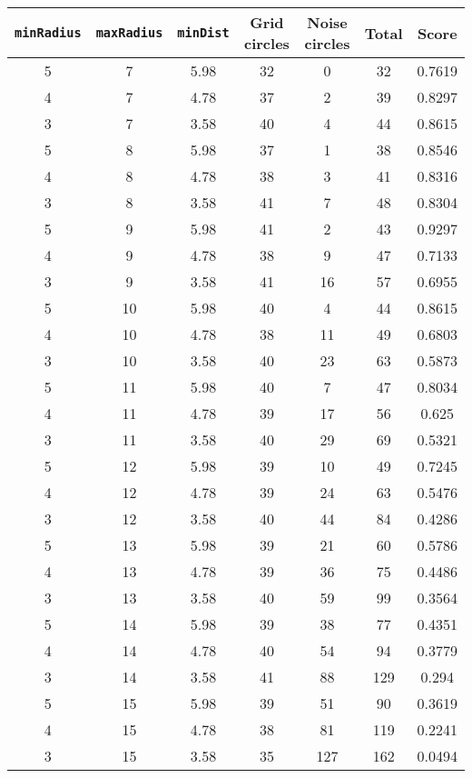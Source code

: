 \documentclass[letterpaper, 12pt]{article}
\begin{document}
\begin{longtable}{|c|c|c|c|c|c|c|}
\hline
\textbf{\texttt{minRadius}} & \textbf{\texttt{maxRadius}} & \textbf{\texttt{minDist}} & \textbf{Grid circles} & \textbf{Noise circles} & \textbf{Total} & \textbf{Score} \\
\hline
5 & 7 & 5.98 & 32 & 0 & 32 & 0.7619 \\
\hline
4 & 7 & 4.78 & 37 & 2 & 39 & 0.8297 \\
\hline
3 & 7 & 3.58 & 40 & 4 & 44 & 0.8615 \\
\hline
5 & 8 & 5.98 & 37 & 1 & 38 & 0.8546 \\
\hline
4 & 8 & 4.78 & 38 & 3 & 41 & 0.8316 \\
\hline
3 & 8 & 3.58 & 41 & 7 & 48 & 0.8304 \\
\hline
5 & 9 & 5.98 & 41 & 2 & 43 & 0.9297 \\
\hline
4 & 9 & 4.78 & 38 & 9 & 47 & 0.7133 \\
\hline
3 & 9 & 3.58 & 41 & 16 & 57 & 0.6955 \\
\hline
5 & 10 & 5.98 & 40 & 4 & 44 & 0.8615 \\
\hline
4 & 10 & 4.78 & 38 & 11 & 49 & 0.6803 \\
\hline
3 & 10 & 3.58 & 40 & 23 & 63 & 0.5873 \\
\hline
5 & 11 & 5.98 & 40 & 7 & 47 & 0.8034 \\
\hline
4 & 11 & 4.78 & 39 & 17 & 56 & 0.625 \\
\hline
3 & 11 & 3.58 & 40 & 29 & 69 & 0.5321 \\
\hline
5 & 12 & 5.98 & 39 & 10 & 49 & 0.7245 \\
\hline
4 & 12 & 4.78 & 39 & 24 & 63 & 0.5476 \\
\hline
3 & 12 & 3.58 & 40 & 44 & 84 & 0.4286 \\
\hline
5 & 13 & 5.98 & 39 & 21 & 60 & 0.5786 \\
\hline
4 & 13 & 4.78 & 39 & 36 & 75 & 0.4486 \\
\hline
3 & 13 & 3.58 & 40 & 59 & 99 & 0.3564 \\
\hline
5 & 14 & 5.98 & 39 & 38 & 77 & 0.4351 \\
\hline
4 & 14 & 4.78 & 40 & 54 & 94 & 0.3779 \\
\hline
3 & 14 & 3.58 & 41 & 88 & 129 & 0.294 \\
\hline
5 & 15 & 5.98 & 39 & 51 & 90 & 0.3619 \\
\hline
4 & 15 & 4.78 & 38 & 81 & 119 & 0.2241 \\
\hline
3 & 15 & 3.58 & 35 & 127 & 162 & 0.0494 \\

\end{longtable}
\end{document}
